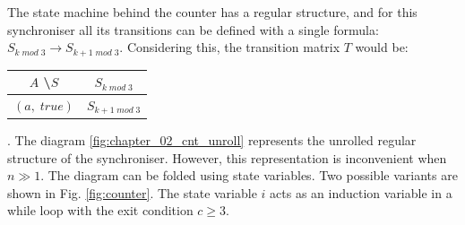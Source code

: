\begin{enumerate}
%

The state machine behind the counter has a regular structure, and for this synchroniser all its transitions can be defined with a single formula: $S_{k \; mod \; 3} \to S_{k+1 \; mod \; 3}$. Considering this, the transition matrix $T$ would be:
  \begin{tabular}{c|c}
  $A$ \textbackslash $S$ & $S_{k \; mod \; 3}$\\
  \hline
  $(a, \; true)$ & $S_{k+1 \; mod \; 3}$
  \end{tabular}

. The diagram \ref{fig:chapter_02_cnt_unroll} represents the unrolled regular structure of the synchroniser. However, this representation is inconvenient when $n \gg 1$. The diagram can be folded using state variables. Two possible variants are shown in Fig. \ref{fig:counter}. The state variable $i$ acts as an induction variable in a while loop with the exit condition $c \ge 3$.



\end{enumerate}
